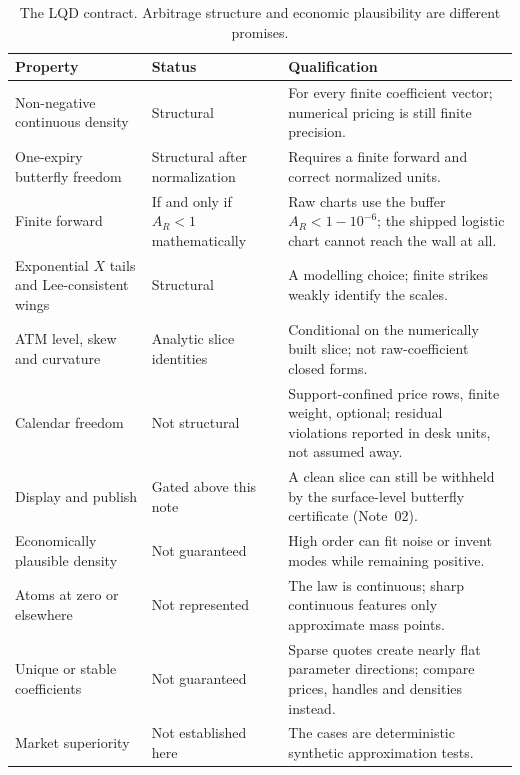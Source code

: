 \documentclass[11pt]{article}
\begin{document}
\begin{table}[H]
\centering\small
\setlength{\tabcolsep}{5pt}
\begin{tabular}{@{}p{}p{}p{}@{}}
\toprule
Property & Status & Qualification\\
\midrule
Non-negative continuous density & Structural & For every finite coefficient
vector; numerical pricing is still finite precision.\\
One-expiry butterfly freedom & Structural after normalization & Requires a
finite forward and correct normalized units.\\
Finite forward & If and only if $A_R<1$ mathematically & Raw charts use the
buffer $A_R<1-10^{-6}$; the shipped logistic chart cannot reach the wall at
all.\\
Exponential $X$ tails and Lee-consistent wings & Structural & A modelling
choice; finite strikes weakly identify the scales.\\
ATM level, skew and curvature & Analytic slice identities & Conditional on the
numerically built slice; not raw-coefficient closed forms.\\
\midrule
Calendar freedom & Not structural & Support-confined price rows, finite
weight, optional; residual violations reported in desk units, not assumed
away.\\
Display and publish & Gated above this note & A clean slice can still be
withheld by the surface-level butterfly certificate (Note~02).\\
Economically plausible density & Not guaranteed & High order can fit noise or
invent modes while remaining positive.\\
Atoms at zero or elsewhere & Not represented & The law is continuous; sharp
continuous features only approximate mass points.\\
Unique or stable coefficients & Not guaranteed & Sparse quotes create nearly
flat parameter directions; compare prices, handles and densities instead.\\
Market superiority & Not established here & The cases are deterministic
synthetic approximation tests.\\
\bottomrule
\end{tabular}
\caption{The LQD contract.  Arbitrage structure and economic plausibility are
different promises.}
\label{tab:contract}
\end{table}
\end{document}
